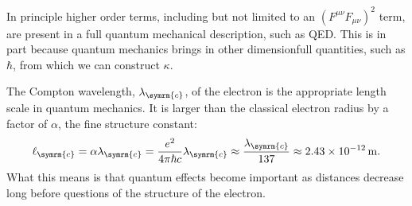 \documentclass[fleqn]{NotesClass}
\newcommand*{\classicalElectronRadius}{\ell_{\symrm{c}}}
\begin{document}
    In principle higher order terms, including but not limited to an \((F^{\mu\nu}F_{\mu\nu})^2\) term, are present in a full quantum mechanical description, such as QED.
    This is in part because quantum mechanics brings in other dimensionfull quantities, such as \(\hbar\), from which we can construct \(\kappa\).
    
    The Compton wavelength, \(\lambda_{\symrm{c}}\), of the electron is the appropriate length scale in quantum mechanics.
    It is larger than the classical electron radius by a factor of \(\alpha\), the fine structure constant:
    \begin{equation}
        \classicalElectronRadius = \alpha \lambda_{\symrm{c}} = \frac{e^2}{4\pi \hbar c} \lambda_{\symrm{c}} \approx \frac{\lambda_{\symrm{c}}}{137} \approx \qty{2.43e-12}{\metre}.
    \end{equation}
    What this means is that quantum effects become important as distances decrease long before questions of the structure of the electron.
    
\end{document}
